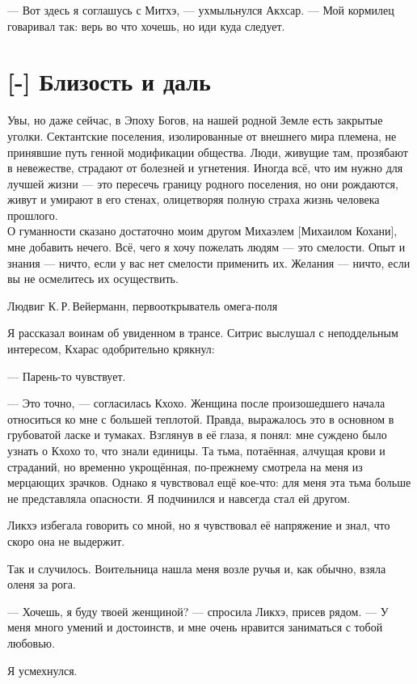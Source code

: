 --- Вот здесь я соглашусь с Митхэ, --- ухмыльнулся Акхсар.
--- Мой кормилец говаривал так: верь во что хочешь, но иди куда следует.

\section{[-] Близость и даль}

\epigraph
{Увы, но даже сейчас, в Эпоху Богов, на нашей родной Земле есть закрытые уголки.
Сектантские поселения, изолированные от внешнего мира племена, не принявшие путь генной модификации общества.
Люди, живущие там, прозябают в невежестве, страдают от болезней и угнетения.
Иногда всё, что им нужно для лучшей жизни --- это пересечь границу родного поселения, но они рождаются, живут и умирают в его стенах, олицетворяя полную страха жизнь человека прошлого.\\
О гуманности сказано достаточно моим другом Михаэлем [Михаилом Кохани], мне добавить нечего.
Всё, чего я хочу пожелать людям --- это смелости.
Опыт и знания --- ничто, если у вас нет смелости применить их.
Желания --- ничто, если вы не осмелитесь их осуществить.}
{Людвиг К.\,Р.\,Вейерманн, первооткрыватель омега-поля}

\textspace

Я рассказал воинам об увиденном в трансе.
Ситрис выслушал с неподдельным интересом, Кхарас одобрительно крякнул:

--- Парень-то чувствует.

--- Это точно, --- согласилась Кхохо.
Женщина после произошедшего начала относиться ко мне с большей теплотой.
Правда, выражалось это в основном в грубоватой ласке и тумаках.
Взглянув в её глаза, я понял: мне суждено было узнать о Кхохо то, что знали единицы.
Та тьма, потаённая, алчущая крови и страданий, но временно укрощённая, по-прежнему смотрела на меня из мерцающих зрачков.
Однако я чувствовал ещё кое-что: для меня эта тьма больше не представляла опасности.
Я подчинился и навсегда стал ей другом.

Ликхэ избегала говорить со мной, но я чувствовал её напряжение и знал, что скоро она не выдержит.

Так и случилось.
Воительница нашла меня возле ручья и, как обычно, взяла оленя за рога.

--- Хочешь, я буду твоей женщиной? --- спросила Ликхэ, присев рядом.
--- У меня много умений и достоинств, и мне очень нравится заниматься с тобой любовью.

Я усмехнулся.

